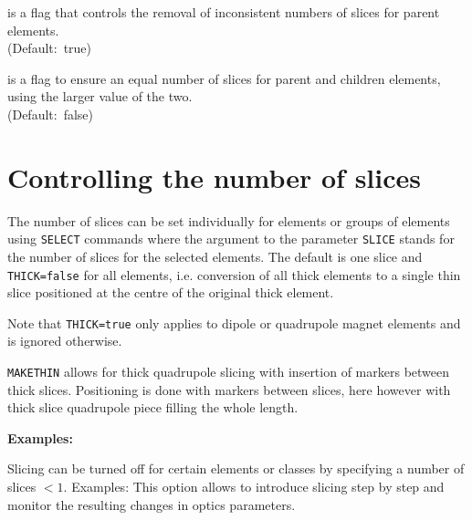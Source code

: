 \begin{madlist}
    is a flag that controls the removal of
   inconsistent numbers of slices for parent elements. \\
   (Default:~true)

    is a flag to ensure an equal number of slices
   for parent and children elements, using the larger value of the two. \\
   (Default:~false)

\end{madlist}

\section{Controlling the number of slices}

The number of slices can be set individually for elements or groups of
elements using \texttt{SELECT} commands
where the argument to the parameter \texttt{SLICE} stands for the number of
slices for the selected elements. The default is one slice and
\texttt{THICK=false} for all elements, i.e. conversion of all thick
elements to a single thin slice positioned at the centre of the original
thick element.

Note that \texttt{THICK=true} only applies to dipole or quadrupole magnet
elements and is ignored otherwise.  

\texttt{MAKETHIN} allows for thick quadrupole slicing with insertion of
markers between thick slices. Positioning is done with markers between
slices, here however with thick slice quadrupole piece filling the whole
length.
  
{\bf Examples:}


Slicing can be turned off for certain elements or classes by specifying
a number of slices $< 1$. Examples: 
This option allows to introduce slicing step by step and monitor the 
resulting changes in optics parameters.

